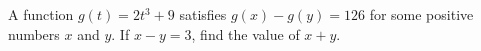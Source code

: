 A function $g(t)=2t^3+9$ satisfies $g(x)-g(y)=126$ for some positive numbers $x$ and $y$. If $x-y=3$, find the value of $x+y$.
